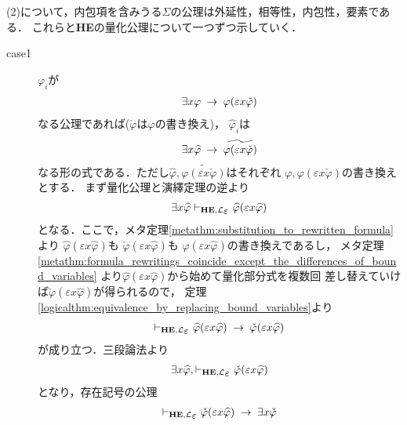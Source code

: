 \begin{metaprf}
		(2)について，内包項を含みうる$\Sigma$の公理は外延性，相等性，内包性，要素である．
		これらと{\bf HE}の量化公理について一つずつ示していく．
		\begin{description}
			\item[case1] $\varphi_{i}$が
				\begin{align}
					\exists x \varphi \hspace{0.25em}\rightarrow\hspace{0.25em} \varphi(\varepsilon x \check{\varphi})
				\end{align}
				なる公理であれば($\check{\varphi}$は$\varphi$の書き換え)，
				$\widehat{\varphi}_{i}$は
				\begin{align}
					\exists x \widehat{\varphi} \hspace{0.25em}\rightarrow\hspace{0.25em} 
					\widetilde{\varphi(\varepsilon x \check{\varphi})}
				\end{align}
				なる形の式である．ただし$\widehat{\varphi},
				\widetilde{\varphi(\varepsilon x \check{\varphi})}$はそれぞれ
				$\varphi,\varphi(\varepsilon x \check{\varphi})$の書き換えとする．
				まず量化公理と演繹定理の逆より
				\begin{align}
					\exists x \widehat{\varphi} \provable{\mbox{{\bf HE}},\lang{\varepsilon}} \widehat{\varphi}(\varepsilon x \widehat{\varphi})
				\end{align}
				となる．ここで，メタ定理\ref{metathm:substitution_to_rewritten_formula}より
				$\widehat{\varphi}(\varepsilon x \widehat{\varphi})$も
				$\check{\varphi}(\varepsilon x \widehat{\varphi})$も
				$\varphi(\varepsilon x \widehat{\varphi})$の書き換えであるし，
				メタ定理\ref{metathm:formula_rewritings_coincide_except_the_differences_of_bound_variables}
				より$\widehat{\varphi}(\varepsilon x \widehat{\varphi})$から始めて量化部分式を複数回
				差し替えていけば$\check{\varphi}(\varepsilon x \widehat{\varphi})$が得られるので，
				定理\ref{logicalthm:equivalence_by_replacing_bound_variables}より
				\begin{align}
					\provable{\mbox{{\bf HE}},\lang{\varepsilon}} \widehat{\varphi}(\varepsilon x \widehat{\varphi}) \rarrow \check{\varphi}(\varepsilon x \widehat{\varphi})
					\label{thm:L_proof_to_L_epsilon_proof_01}
				\end{align}
				が成り立つ．三段論法より
				\begin{align}
					\exists x \widehat{\varphi}, \provable{\mbox{{\bf HE}},\lang{\varepsilon}} \check{\varphi}(\varepsilon x \widehat{\varphi})
				\end{align}
				となり，存在記号の公理
				\begin{align}
					\provable{\mbox{{\bf HE}},\lang{\varepsilon}} \check{\varphi}(\varepsilon x \widehat{\varphi}) \rarrow \exists x \check{\varphi}

\end{align}
\end{description}
\end{metaprf}
